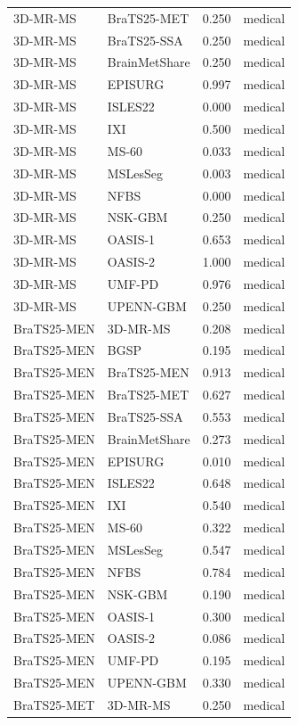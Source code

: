 \begin{tabular}{llrl}
3D-MR-MS & BraTS25-MET & 0.250 & medical \\
3D-MR-MS & BraTS25-SSA & 0.250 & medical \\
3D-MR-MS & BrainMetShare & 0.250 & medical \\
3D-MR-MS & EPISURG & 0.997 & medical \\
3D-MR-MS & ISLES22 & 0.000 & medical \\
3D-MR-MS & IXI & 0.500 & medical \\
3D-MR-MS & MS-60 & 0.033 & medical \\
3D-MR-MS & MSLesSeg & 0.003 & medical \\
3D-MR-MS & NFBS & 0.000 & medical \\
3D-MR-MS & NSK-GBM & 0.250 & medical \\
3D-MR-MS & OASIS-1 & 0.653 & medical \\
3D-MR-MS & OASIS-2 & 1.000 & medical \\
3D-MR-MS & UMF-PD & 0.976 & medical \\
3D-MR-MS & UPENN-GBM & 0.250 & medical \\
BraTS25-MEN & 3D-MR-MS & 0.208 & medical \\
BraTS25-MEN & BGSP & 0.195 & medical \\
BraTS25-MEN & BraTS25-MEN & 0.913 & medical \\
BraTS25-MEN & BraTS25-MET & 0.627 & medical \\
BraTS25-MEN & BraTS25-SSA & 0.553 & medical \\
BraTS25-MEN & BrainMetShare & 0.273 & medical \\
BraTS25-MEN & EPISURG & 0.010 & medical \\
BraTS25-MEN & ISLES22 & 0.648 & medical \\
BraTS25-MEN & IXI & 0.540 & medical \\
BraTS25-MEN & MS-60 & 0.322 & medical \\
BraTS25-MEN & MSLesSeg & 0.547 & medical \\
BraTS25-MEN & NFBS & 0.784 & medical \\
BraTS25-MEN & NSK-GBM & 0.190 & medical \\
BraTS25-MEN & OASIS-1 & 0.300 & medical \\
BraTS25-MEN & OASIS-2 & 0.086 & medical \\
BraTS25-MEN & UMF-PD & 0.195 & medical \\
BraTS25-MEN & UPENN-GBM & 0.330 & medical \\
BraTS25-MET & 3D-MR-MS & 0.250 & medical \\

\end{tabular}
